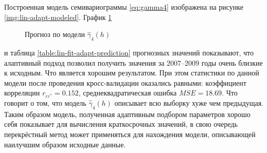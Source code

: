 Построенная модель семивариограммы \eqref{eq:gamma4} изображена на рисунке \ref{img:lin-adapt-modeled}. График \ref{img:lin-adapt-pred}
\begin{figure}[ht]
\caption{Прогноз по модели $ \widehat{\gamma}_4(h) $}
\label{img:lin-adapt-pred}
\end{figure}
и таблица \ref{table:lin-fit-adapt-prediction} прогнозных значений показывают, что алаптивный подход позволил получить значения за $ 2007 $--$ 2009 $ годы очень близкие к исходным. Что является хорошим результатом. При этом статистики по данной модели после проведения кросс-валидации оказались равными: коэффициент корреляции $ r_{\varepsilon\varepsilon^{*}} = 0.152 $, среднеквадратическая ошибка $ MSE = 18.69 $. Что говорит о том, что модель $ \widehat{\gamma}_4(h) $ описывает всю выборку хуже чем предыдущая. Таким образом модель, полученная адаптивным подбором параметров хорошо себя показывает для вычисления краткосрочных значений, в свою очередь перекрёстный метод может применяться для нахождения модели, описывающей наилучшим образом исходные данные.



